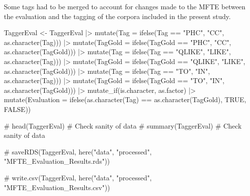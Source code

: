 \documentclass[
  letterpaper,
  DIV=11,
  numbers=noendperiod]{scrreprt}
\newenvironment{Shaded}{\begin{snugshade}}{\end{snugshade}}
\newcommand{\AttributeTok}[1]{\textcolor[rgb]{0.40,0.45,0.13}{#1}}
\newcommand{\CommentTok}[1]{\textcolor[rgb]{0.37,0.37,0.37}{#1}}
\newcommand{\ConstantTok}[1]{\textcolor[rgb]{0.56,0.35,0.01}{#1}}
\newcommand{\FunctionTok}[1]{\textcolor[rgb]{0.28,0.35,0.67}{#1}}
\newcommand{\NormalTok}[1]{\textcolor[rgb]{0.00,0.23,0.31}{#1}}
\newcommand{\OtherTok}[1]{\textcolor[rgb]{0.00,0.23,0.31}{#1}}
\newcommand{\SpecialCharTok}[1]{\textcolor[rgb]{0.37,0.37,0.37}{#1}}
\newcommand{\StringTok}[1]{\textcolor[rgb]{0.13,0.47,0.30}{#1}}
\begin{document}
Some tags had to be merged to account for changes made to the MFTE
between the evaluation and the tagging of the corpora included in the
present study.

\begin{Shaded}
\begin{Highlighting}[]
\NormalTok{TaggerEval }\OtherTok{\textless{}{-}}\NormalTok{ TaggerEval }\SpecialCharTok{|\textgreater{}} 
  \FunctionTok{mutate}\NormalTok{(}\AttributeTok{Tag =} \FunctionTok{ifelse}\NormalTok{(Tag }\SpecialCharTok{==} \StringTok{"PHC"}\NormalTok{, }\StringTok{"CC"}\NormalTok{, }\FunctionTok{as.character}\NormalTok{(Tag))) }\SpecialCharTok{|\textgreater{}} 
  \FunctionTok{mutate}\NormalTok{(}\AttributeTok{TagGold =} \FunctionTok{ifelse}\NormalTok{(TagGold }\SpecialCharTok{==} \StringTok{"PHC"}\NormalTok{, }\StringTok{"CC"}\NormalTok{, }\FunctionTok{as.character}\NormalTok{(TagGold))) }\SpecialCharTok{|\textgreater{}} 
  \FunctionTok{mutate}\NormalTok{(}\AttributeTok{Tag =} \FunctionTok{ifelse}\NormalTok{(Tag }\SpecialCharTok{==} \StringTok{"QLIKE"}\NormalTok{, }\StringTok{"LIKE"}\NormalTok{, }\FunctionTok{as.character}\NormalTok{(Tag))) }\SpecialCharTok{|\textgreater{}} 
  \FunctionTok{mutate}\NormalTok{(}\AttributeTok{TagGold =} \FunctionTok{ifelse}\NormalTok{(TagGold }\SpecialCharTok{==} \StringTok{"QLIKE"}\NormalTok{, }\StringTok{"LIKE"}\NormalTok{, }\FunctionTok{as.character}\NormalTok{(TagGold))) }\SpecialCharTok{|\textgreater{}} 
  \FunctionTok{mutate}\NormalTok{(}\AttributeTok{Tag =} \FunctionTok{ifelse}\NormalTok{(Tag }\SpecialCharTok{==} \StringTok{"TO"}\NormalTok{, }\StringTok{"IN"}\NormalTok{, }\FunctionTok{as.character}\NormalTok{(Tag))) }\SpecialCharTok{|\textgreater{}} 
  \FunctionTok{mutate}\NormalTok{(}\AttributeTok{TagGold =} \FunctionTok{ifelse}\NormalTok{(TagGold }\SpecialCharTok{==} \StringTok{"TO"}\NormalTok{, }\StringTok{"IN"}\NormalTok{, }\FunctionTok{as.character}\NormalTok{(TagGold))) }\SpecialCharTok{|\textgreater{}} 
  \FunctionTok{mutate\_if}\NormalTok{(is.character, as.factor) }\SpecialCharTok{|\textgreater{}} 
  \FunctionTok{mutate}\NormalTok{(}\AttributeTok{Evaluation =} \FunctionTok{ifelse}\NormalTok{(}\FunctionTok{as.character}\NormalTok{(Tag) }\SpecialCharTok{==} \FunctionTok{as.character}\NormalTok{(TagGold), }\ConstantTok{TRUE}\NormalTok{, }\ConstantTok{FALSE}\NormalTok{))}

\CommentTok{\# head(TaggerEval) \# Check sanity of data}
\CommentTok{\# summary(TaggerEval) \# Check sanity of data}

\CommentTok{\# saveRDS(TaggerEval, here("data", "processed", "MFTE\_Evaluation\_Results.rds"))}

\CommentTok{\# write.csv(TaggerEval, here("data", "processed", "MFTE\_Evaluation\_Results.csv"))}
\end{Highlighting}
\end{Shaded}
\end{document}
